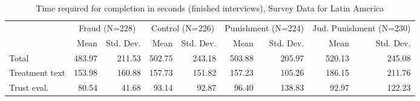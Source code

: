 \begin{table}

\caption{Time required for completion in seconds (finished interviews), Survey Data for Latin America}
\centering
\begin{tabular}[t]{lrrrrrrrr}
\toprule
\multicolumn{1}{c}{ } & \multicolumn{2}{c}{Fraud (N=228)} & \multicolumn{2}{c}{Control (N=226)} & \multicolumn{2}{c}{Punishment (N=224)} & \multicolumn{2}{c}{Jud. Punishment (N=230)} \\
\cmidrule(l{3pt}r{3pt}){2-3} \cmidrule(l{3pt}r{3pt}){4-5} \cmidrule(l{3pt}r{3pt}){6-7} \cmidrule(l{3pt}r{3pt}){8-9}
  & Mean & Std. Dev. & Mean & Std. Dev. & Mean & Std. Dev. & Mean & Std. Dev.\\
\midrule
Total & 483.97 & 211.53 & 502.75 & 243.18 & 503.88 & 205.97 & 520.13 & 245.08\\
Treatment text & 153.98 & 160.88 & 157.73 & 151.82 & 157.23 & 105.26 & 186.15 & 211.76\\
Trust eval. & 80.54 & 41.68 & 93.14 & 92.87 & 96.40 & 138.83 & 92.97 & 122.23\\
\bottomrule
\end{tabular}
\end{table}
